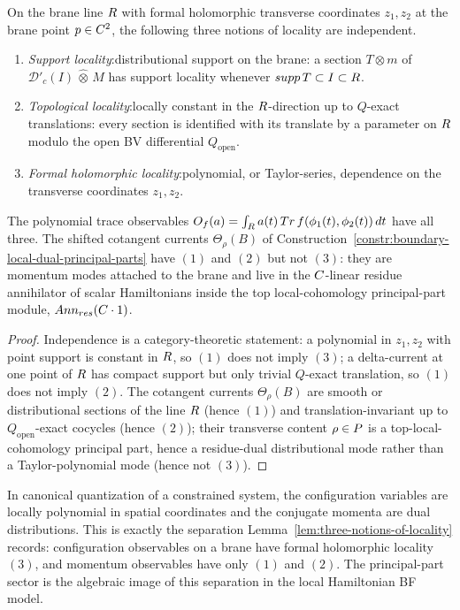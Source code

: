 \documentclass[11pt]{memoir}
\begin{document}
\begin{lem}\label{lem:three-notions-of-locality}
  On the brane line $R$ with formal holomorphic transverse coordinates
  $z_1,z_2$ at the brane point $p\in C^2$, the following three notions of
  locality are independent.
  \begin{enumerate}
    \item \emph{Support locality}:distributional support on the
      brane: a section $T\otimes m$ of $\mathcal D'_c(I)\,\widehat\otimes\,M$
      has support locality whenever $supp\,T\subset I\subset R$.
    \item \emph{Topological locality}:locally constant in the
      $R$-direction up to $Q$-exact translations: every section is
      identified with its translate by a parameter on $R$ modulo the open
      BV differential $Q_{\mathrm{open}}$.
    \item \emph{Formal holomorphic locality}:polynomial, or
      Taylor-series, dependence on the transverse coordinates $z_1,z_2$.
  \end{enumerate}
  The polynomial trace observables
  $O_f(a)=\int_{R} a(t)\,
   Tr\,f(\phi_1(t),\phi_2(t))\,dt$ have all three. The
  shifted cotangent currents $\Theta_\rho(B)$ of
  Construction~\ref{constr:boundary-local-dual-principal-parts} have $(1)$
  and $(2)$ but not $(3)$: they are momentum modes attached to the brane
  and live in the \(C\)-linear residue annihilator of scalar
  Hamiltonians inside the top local-cohomology principal-part module,
  \(Ann_{res}(C\cdot1)\).
\end{lem}

\begin{proof}
  Independence is a category-theoretic statement: a polynomial in $z_1,z_2$
  with point support is constant in $R$, so $(1)$ does not imply $(3)$;
  a delta-current at one point of $R$ has compact support but only trivial
  $Q$-exact translation, so $(1)$ does not imply $(2)$. The cotangent
  currents $\Theta_\rho(B)$ are smooth or distributional sections of the
  line $R$ (hence $(1)$) and translation-invariant up to
  $Q_{\mathrm{open}}$-exact cocycles (hence $(2)$); their transverse
  content \(\rho\in P\) is a top-local-cohomology principal part,
  hence a residue-dual distributional mode rather than a Taylor-polynomial
  mode (hence not $(3)$).
\end{proof}

\begin{rmk}\label{rmk:locality-canonical-quantization}
  In canonical quantization of a constrained system, the configuration
  variables are locally polynomial in spatial coordinates and the conjugate
  momenta are dual distributions. This is exactly the separation
  Lemma~\ref{lem:three-notions-of-locality} records: configuration
  observables on a brane have formal holomorphic locality $(3)$, and
  momentum observables have only $(1)$ and $(2)$. The principal-part
  sector is the algebraic image of this separation in the local Hamiltonian
  BF model.
\end{rmk}
\end{document}
